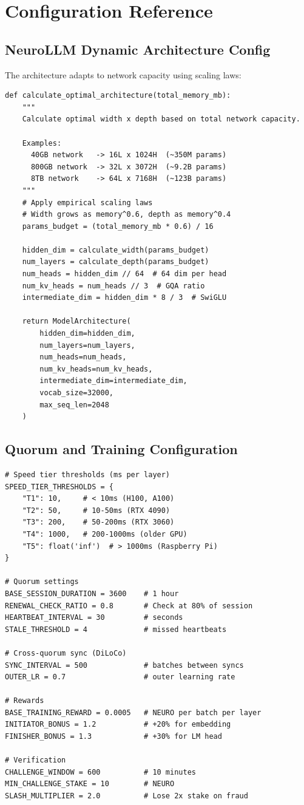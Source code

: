 \documentclass[11pt,a4paper]{article}
\begin{document}
\section{Configuration Reference}

\subsection{NeuroLLM Dynamic Architecture Config}

The architecture adapts to network capacity using scaling laws:

\begin{lstlisting}[caption=Dynamic Architecture Calculation]
def calculate_optimal_architecture(total_memory_mb):
    """
    Calculate optimal width x depth based on total network capacity.
    
    Examples:
      40GB network   -> 16L x 1024H  (~350M params)
      800GB network  -> 32L x 3072H  (~9.2B params)
      8TB network    -> 64L x 7168H  (~123B params)
    """
    # Apply empirical scaling laws
    # Width grows as memory^0.6, depth as memory^0.4
    params_budget = (total_memory_mb * 0.6) / 16
    
    hidden_dim = calculate_width(params_budget)
    num_layers = calculate_depth(params_budget)
    num_heads = hidden_dim // 64  # 64 dim per head
    num_kv_heads = num_heads // 3  # GQA ratio
    intermediate_dim = hidden_dim * 8 / 3  # SwiGLU
    
    return ModelArchitecture(
        hidden_dim=hidden_dim,
        num_layers=num_layers,
        num_heads=num_heads,
        num_kv_heads=num_kv_heads,
        intermediate_dim=intermediate_dim,
        vocab_size=32000,
        max_seq_len=2048
    )
\end{lstlisting}

\subsection{Quorum and Training Configuration}

\begin{lstlisting}[caption=Quorum and Training Parameters]
# Speed tier thresholds (ms per layer)
SPEED_TIER_THRESHOLDS = {
    "T1": 10,     # < 10ms (H100, A100)
    "T2": 50,     # 10-50ms (RTX 4090)
    "T3": 200,    # 50-200ms (RTX 3060)
    "T4": 1000,   # 200-1000ms (older GPU)
    "T5": float('inf')  # > 1000ms (Raspberry Pi)
}

# Quorum settings
BASE_SESSION_DURATION = 3600    # 1 hour
RENEWAL_CHECK_RATIO = 0.8       # Check at 80% of session
HEARTBEAT_INTERVAL = 30         # seconds
STALE_THRESHOLD = 4             # missed heartbeats

# Cross-quorum sync (DiLoCo)
SYNC_INTERVAL = 500             # batches between syncs
OUTER_LR = 0.7                  # outer learning rate

# Rewards
BASE_TRAINING_REWARD = 0.0005   # NEURO per batch per layer
INITIATOR_BONUS = 1.2           # +20% for embedding
FINISHER_BONUS = 1.3            # +30% for LM head

# Verification
CHALLENGE_WINDOW = 600          # 10 minutes
MIN_CHALLENGE_STAKE = 10        # NEURO
SLASH_MULTIPLIER = 2.0          # Lose 2x stake on fraud
\end{lstlisting}
\end{document}
